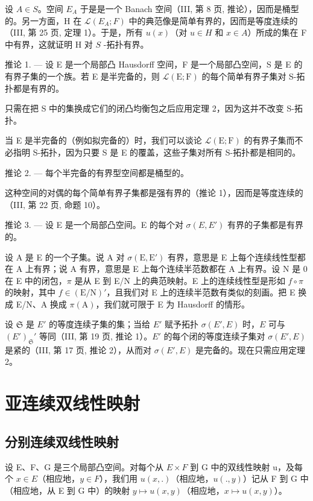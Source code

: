 设 \(A \in S\)。空间 \(E_A\) 于是是一个 Banach 空间（III, 第 8 页, 推论），因而是桶型的。另一方面，H 在 \(\mathcal{L}(E_A; F)\) 中的典范像是简单有界的，因而是等度连续的（III, 第 25 页, 定理 1）。于是，所有 \(u(x)\)（对 \(u \in H\) 和 \(x \in A\)）所成的集在 F 中有界，这就证明 H 对 \(S\) -拓扑有界。

推论 1. --- 设 E 是一个局部凸 Hausdorff 空间，F 是一个局部凸空间，S 是 E 的有界子集的一个族。若 E 是半完备的，则 \(\mathcal{L}(\mathrm{E};\mathrm{F})\) 的每个简单有界子集对 S-拓扑都是有界的。

只需在把 S 中的集换成它们的闭凸均衡包之后应用定理 2，因为这并不改变 S-拓扑。

当 E 是半完备的（例如拟完备的）时，我们可以谈论 \(\mathcal{L}(\mathrm{E};\mathrm{F})\) 的有界子集而不必指明 S-拓扑，因为只要 S 是 E 的覆盖，这些子集对所有 S-拓扑都是相同的。

推论 2. --- 每个半完备的有界型空间都是桶型的。

这种空间的对偶的每个简单有界子集都是强有界的（推论 1），因而是等度连续的（III, 第 22 页, 命题 10）。

推论 3. --- 设 E 是一个局部凸空间。E 的每个对 \(\sigma(E, E')\) 有界的子集都是有界的。

设 A 是 E 的一个子集。说 A 对 \(\sigma(\mathrm{E}, \mathrm{E}')\) 有界，意思是 E 上每个连续线性型都在 A 上有界；说 A 有界，意思是 E 上每个连续半范数都在 A 上有界。设 N 是 0 在 E 中的闭包，\(\pi\) 是从 E 到 E/N 上的典范映射。E 上的连续线性型是形如 \(f \circ \pi\) 的映射，其中 \(f \in (\mathrm{E}/\mathrm{N})'\)，且我们对 E 上的连续半范数有类似的刻画。把 E 换成 E/N、A 换成 \(\pi(\mathrm{A})\)，我们就可限于 E 为 Hausdorff 的情形。

设 \(\mathfrak{S}\) 是 \(E'\) 的等度连续子集的集；当给 \(E'\) 赋予拓扑 \(\sigma(E', E)\) 时，\(E\) 可与 \((E')_{\mathfrak{S}}'\) 等同（III, 第 19 页, 推论 1）。\(E'\) 的每个闭的等度连续子集对 \(\sigma(E', E)\) 是紧的（III, 第 17 页, 推论 2），从而对 \(\sigma(E', E)\) 是完备的。现在只需应用定理 2。

\section{亚连续双线性映射}

\subsection{分别连续双线性映射}

设 E、F、G 是三个局部凸空间。对每个从 \(E \times F\) 到 G 中的双线性映射 u，及每个 \(x \in E\)（相应地，\(y \in F\)），我们用 \(u(x, .)\)（相应地，\(u(., y)\)）记从 F 到 G 中（相应地，从 E 到 G 中）的映射 \(y \mapsto u(x, y)\)（相应地，\(x \mapsto u(x, y)\)）。

